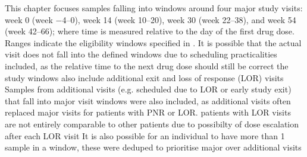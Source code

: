 \begin{outline}
%
%
%

\1 This chapter focuses samples falling into windows around four major study visits: week 0 (week \numrange{-4}{0}), week 14 (week \numrange{10}{20}), week 30 (week \numrange{22}{38}), and week 54 (week \numrange{42}{66});
where time is measured relative to the day of the first drug dose.
    \2 Ranges indicate the eligibility windows specified in \textcite{kennedy2019PredictorsAntiTNFTreatment}.
    \2 It is possible that the actual visit does not fall into the defined windows due to scheduling practicalities
        \3 included, as the relative time to the next drug dose should still be correct
    \2 the study windows also include additional exit and loss of response (LOR) visits
        \3 Samples from additional visits (e.g. scheduled due to \gls{LOR} or early study exit) that fall into major visit windows were also included, as additional visits often replaced major visits for patients with \gls{PNR} or \gls{LOR}.
        \3 patients with LOR visits are not entirely comparable to other patients due to possibilty of dose escalation after each LOR visit
        \3 It is also possible for an individual to have more than 1 sample in a window, these were deduped to prioritise major over additional visits



\end{outline}
